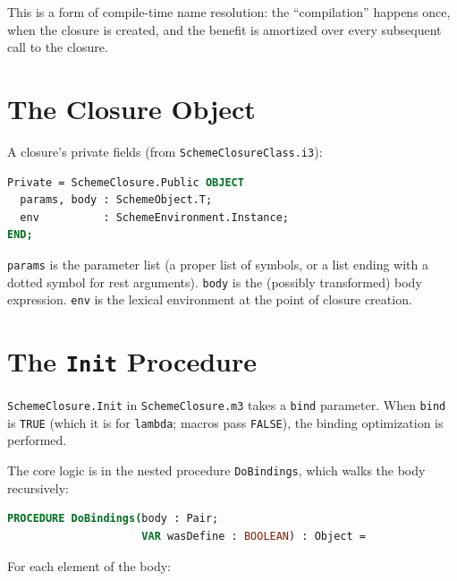 \documentclass[12pt]{report}
\begin{document}
This is a form of compile-time name resolution: the ``compilation''
happens once, when the closure is created, and the benefit is
amortized over every subsequent call to the closure.

\section{The Closure Object}

A closure's private fields (from \texttt{SchemeClosureClass.i3}):

\begin{lstlisting}[language=Modula3]
Private = SchemeClosure.Public OBJECT
  params, body : SchemeObject.T;
  env          : SchemeEnvironment.Instance;
END;
\end{lstlisting}

\texttt{params} is the parameter list (a proper list of symbols, or a
list ending with a dotted symbol for rest arguments).  \texttt{body} is
the (possibly transformed) body expression.  \texttt{env} is the
lexical environment at the point of closure creation.

\section{The \texttt{Init} Procedure}

\texttt{SchemeClosure.Init} in \texttt{SchemeClosure.m3} takes a
\texttt{bind} parameter.  When \texttt{bind} is \texttt{TRUE} (which
it is for \texttt{lambda}; macros pass \texttt{FALSE}), the binding
optimization is performed.

The core logic is in the nested procedure \texttt{DoBindings}, which
walks the body recursively:

\begin{lstlisting}[language=Modula3]
PROCEDURE DoBindings(body : Pair;
                     VAR wasDefine : BOOLEAN) : Object =
\end{lstlisting}

For each element of the body:
\end{document}
